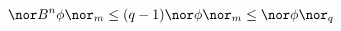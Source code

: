 \begin{equation}
\nor B^n\phi \nor_m\le (q-1)\nor \phi \nor_m\le \nor\phi\nor_q
\label{eq:bounded}
\end{equation}

